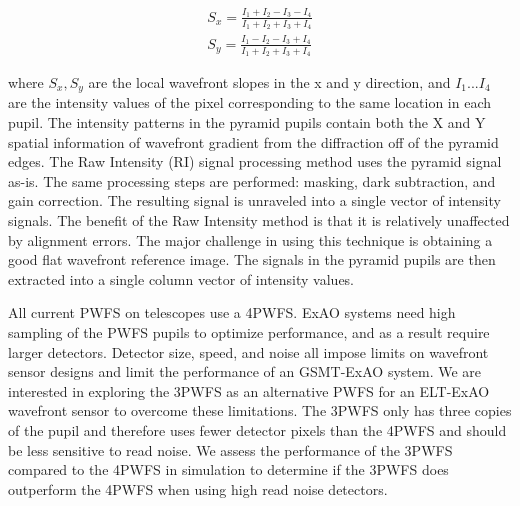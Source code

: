\begin{eqnarray}
    S_x=\frac{I_1+I_2-I_3-I_4}{I_1+I_2+I_3+I_4}     \label{4PWFSslopes} \\
    S_y=\frac{I_1-I_2-I_3+I_4}{I_1+I_2+I_3+I_4} \nonumber
\end{eqnarray}

where $S_x, S_y$ are the local wavefront slopes in the x and y direction, and $I_1...I_4$ are the intensity values of the pixel corresponding to the same location in each pupil. The intensity patterns in the pyramid pupils contain both the X and Y spatial information of wavefront gradient from the diffraction off of the pyramid edges. The Raw Intensity (RI) signal processing method uses the pyramid signal as-is. The same processing steps are performed: masking, dark subtraction, and gain correction. The resulting signal is unraveled into a single vector of intensity signals. The benefit of the Raw Intensity method is that it is relatively unaffected by alignment errors. The major challenge in using this technique is obtaining a good flat wavefront reference image. The signals in the pyramid pupils are then extracted into a single column vector of intensity values.

All current PWFS on telescopes use a 4PWFS. ExAO systems need high sampling of the PWFS pupils to optimize performance, and as a result require larger detectors. Detector size, speed, and noise all impose limits on wavefront sensor designs and limit the performance of an GSMT-ExAO system. We are interested in exploring the 3PWFS as an alternative PWFS for an ELT-ExAO wavefront sensor to overcome these limitations. The 3PWFS only has three copies of the pupil and therefore uses fewer detector pixels than the 4PWFS and should be less sensitive to read noise. We assess the performance of the 3PWFS compared to the 4PWFS in simulation to determine if the 3PWFS does outperform the 4PWFS when using high read noise detectors.

